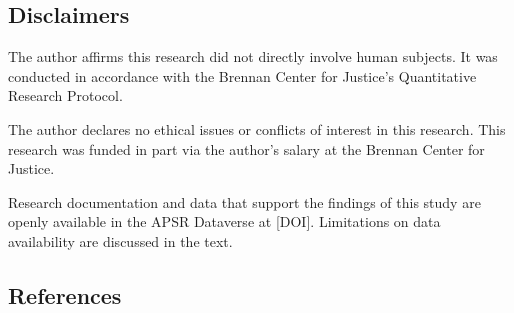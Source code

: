 \documentclass[
  12pt,
]{article}
\begin{document}
\newpage

\hypertarget{disclaimers}{%
\subsection*{Disclaimers}\label{disclaimers}}

The author affirms this research did not directly involve human subjects. It was conducted in accordance with the Brennan Center for Justice's Quantitative Research Protocol.

The author declares no ethical issues or conflicts of interest in this research. This research was funded in part via the author's salary at the Brennan Center for Justice.

Research documentation and data that support the findings of this study are openly available in the APSR Dataverse at {[}DOI{]}. Limitations on data availability are discussed in the text.

\newpage

\hypertarget{references}{%
\subsection*{References}\label{references}}
\end{document}

